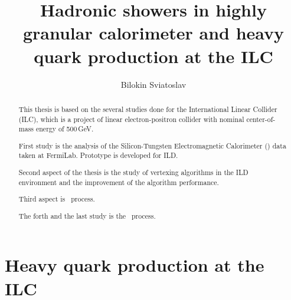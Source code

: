 \documentclass[a4paper]{article}
\title{Hadronic showers in highly granular calorimeter and heavy quark production at the ILC}
\author{Bilokin Sviatoslav}
\begin{document}
\maketitle
\begin{abstract}
This thesis is based on the several studies done for the International Linear Collider (ILC), which is a project of linear electron-positron collider with nominal center-of-mass energy of 500\,GeV.

First study is the analysis of the Silicon-Tungsten Electromagnetic Calorimeter (\ecal) data taken at FermiLab. Prototype is developed for ILD.

Second aspect of the thesis is the study of vertexing algorithms in the ILD environment and the improvement of the algorithm performance.

Third aspect is \ttbar\ process.

The forth and the last study is the \bbbar\ process.
\end{abstract}
\tableofcontents
\linenumbers
%
%

\newpage
%
\newpage
\part{Heavy quark production at the ILC}

\end{document}

